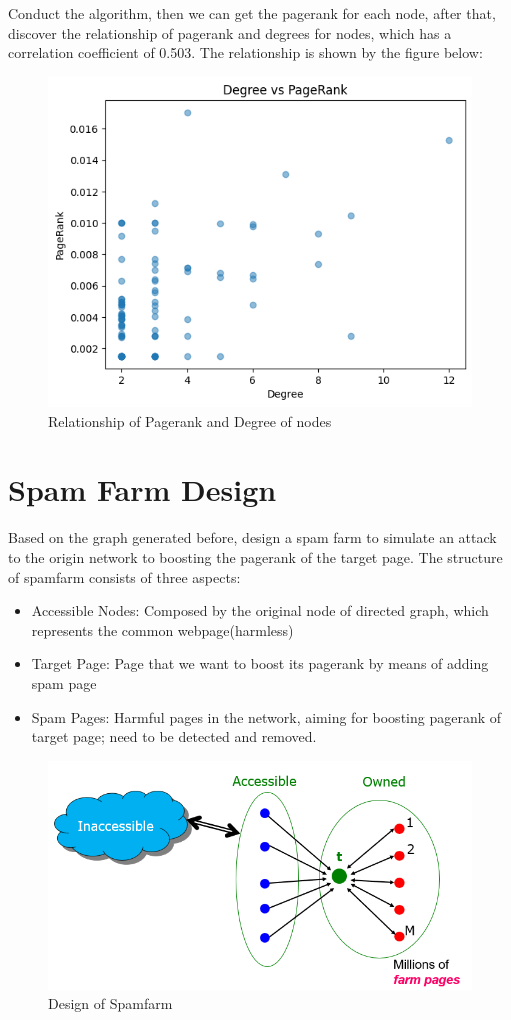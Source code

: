 \documentclass{article}
\begin{document}
	Conduct the algorithm, then we can get the pagerank for each node, after that, discover the relationship of pagerank and degrees for nodes, which has a correlation coefficient of 0.503. The relationship is shown by the figure below:
	\begin{figure}[H]
		\centering
		\includegraphics[scale=0.5]{relationship of pagerank and degree.png}
		\caption{Relationship of Pagerank and Degree of nodes}
	\end{figure}
	
	\section*{Spam Farm Design}
	Based on the graph generated before, design a spam farm to simulate an attack
	to the origin network to boosting the pagerank of the target page.
	The structure of spamfarm consists of three aspects:
	\begin{itemize}
		\item Accessible Nodes: Composed by the original node of directed graph, which represents the common webpage(harmless)
		\item Target Page: Page that we want to boost its pagerank by means of adding spam page
		\item Spam Pages: Harmful pages in the network, aiming for boosting pagerank of target page; need to be detected and removed.
	\end{itemize}
	\begin{figure}[H]
		\centering
		\includegraphics[scale=0.5]{spamfarm.png}
		\caption{Design of Spamfarm}
	\end{figure}
	
\end{document}
